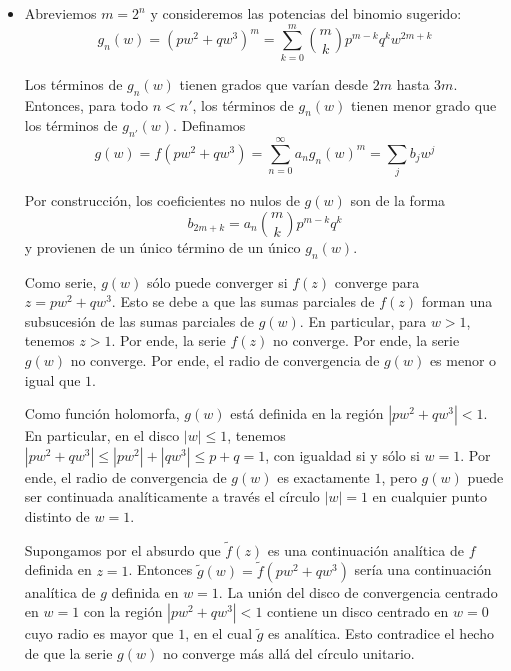 \begin{solution}
\begin{itemize}
    \item Abreviemos $m = 2^n$ y consideremos las potencias del binomio sugerido:
    $$g_n(w) = (pw^2 + qw^3)^m = \sum_{k=0}^m \binom mk p^{m-k} q^k w^{2m+k}$$
    
    Los términos de $g_n(w)$ tienen grados que varían desde $2m$ hasta $3m$. Entonces, para todo $n < n'$,  los términos de $g_n(w)$ tienen menor grado que los términos de $g_{n'}(w)$. Definamos
    $$g(w) = f(pw^2 + qw^3) = \sum_{n=0}^\infty a_n g_n(w)^m = \sum_j b_j w^j$$
    
    Por construcción, los coeficientes no nulos de $g(w)$ son de la forma
    $$b_{2m+k} = a_n \binom mk p^{m-k} q^k$$
    y provienen de un único término de un único $g_n(w)$.
    
    Como serie, $g(w)$ sólo puede converger si $f(z)$ converge para $z = pw^2 + qw^3$. Esto se debe a que las sumas parciales de $f(z)$ forman una subsucesión de las sumas parciales de $g(w)$. En particular, para $w > 1$, tenemos $z > 1$. Por ende, la serie $f(z)$ no converge. Por ende, la serie $g(w)$ no converge. Por ende, el radio de convergencia de $g(w)$ es menor o igual que $1$.
    
    Como función holomorfa, $g(w)$ está definida en la región $|pw^2 + qw^3| < 1$. En particular, en el disco $|w| \le 1$, tenemos $|pw^2 + qw^3| \le |pw^2| + |qw^3| \le p + q = 1$, con igualdad si y sólo si $w = 1$. Por ende, el radio de convergencia de $g(w)$ es exactamente $1$, pero $g(w)$ puede ser continuada analíticamente a través el círculo $|w| = 1$ en cualquier punto distinto de $w = 1$.
    
    Supongamos por el absurdo que $\tilde f(z)$ es una continuación analítica de $f$ definida en $z = 1$. Entonces $\tilde g(w) = \tilde f(pw^2 + qw^3)$ sería una continuación analítica de $g$ definida en $w = 1$. La unión del disco de convergencia centrado en $w = 1$ con la región $|pw^2 + qw^3| < 1$ contiene un disco centrado en $w = 0$ cuyo radio es mayor que $1$, en el cual $\tilde g$ es analítica. Esto contradice el hecho de que la serie $g(w)$ no converge más allá del círculo unitario.
\end{itemize}
\end{solution}
